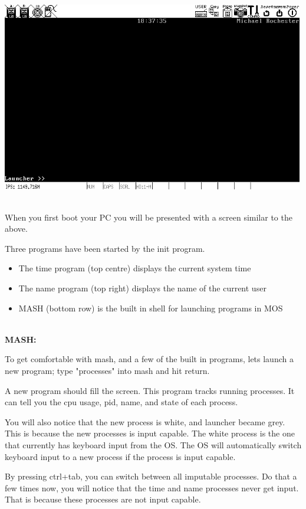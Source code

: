 \documentclass[a4paper]{report}
\begin{document}
\includegraphics[width=500px]{images/MOS.png}

\\
When you first boot your PC you will be presented with a screen similar to the above.

Three programs have been started by the init program.


\begin{itemize}
\item The time program (top centre) displays the current system time
\item The name program (top right) displays the name of the current user
\item MASH (bottom row) is the built in shell for launching programs in MOS
\end{itemize}

\\
\textbf {MASH:}

To get comfortable with mash, and a few of the built in programs, lets launch a new program; type "processes" into mash and hit return.

A new program should fill the screen. This program tracks running processes. It can tell you the cpu usage, pid, name, and state of each process.

You will also notice that the new process is white, and launcher became grey. This is because the new processes is input capable. The white process is the one that currently has keyboard input from the OS. The OS will automatically switch keyboard input to a new process if the process is input capable.

By pressing ctrl+tab, you can switch between all imputable processes. Do that a few times now, you will notice that the time and name processes never get input. That is because these processes are not input capable.
\end{document}
